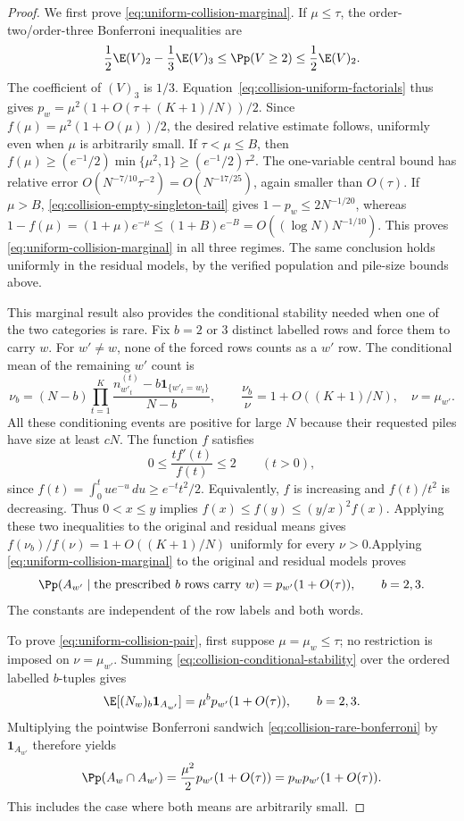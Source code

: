 \begin{proof}
We first prove \eqref{eq:uniform-collision-marginal}.
If $\mu\le\tau$, the order-two/order-three Bonferroni inequalities are
\begin{equation}
\label{eq:collision-rare-bonferroni}
 \frac12\E(V)_2-\frac13\E(V)_3
 \le\Pp(V\ge2)\le\frac12\E(V)_2.
\end{equation}
The coefficient of $(V)_3$ is $1/3$.
Equation~\eqref{eq:collision-uniform-factorials} thus gives
$p_w=\mu^2(1+O(\tau+(K+1)/N))/2$.
Since $f(\mu)=\mu^2(1+O(\mu))/2$, the desired relative estimate follows,
uniformly even when $\mu$ is arbitrarily small.
If $\tau<\mu\le B$, then $f(\mu)\ge(e^{-1}/2)\min\{\mu^2,1\}\ge(e^{-1}/2)\tau^2$.
The one-variable central bound has relative error
$O(N^{-7/10}\tau^{-2})=O(N^{-17/25})$, again smaller than $O(\tau)$.
If $\mu>B$, \eqref{eq:collision-empty-singleton-tail} gives
$1-p_w\le2N^{-1/20}$, whereas
$1-f(\mu)=(1+\mu)e^{-\mu}\le(1+B)e^{-B}=O((\log N)N^{-1/10})$.
This proves \eqref{eq:uniform-collision-marginal} in all three regimes.
The same conclusion holds uniformly in the residual models, by the verified
population and pile-size bounds above.

This marginal result also provides the conditional stability needed when
one of the two categories is rare. Fix $b=2$ or $3$ distinct labelled rows
and force them to carry $w$. For $w'\ne w$, none of the forced rows counts
as a $w'$ row. The conditional mean of the remaining $w'$ count is
\[
 \nu_b=(N-b)\prod_{t=1}^{K}
 \frac{n_{w'_t}^{(t)}-b\mathbf 1_{\{w'_t=w_t\}}}{N-b},
 \qquad \frac{\nu_b}{\nu}=1+O((K+1)/N),\quad\nu=\mu_{w'}.
\]
All these conditioning events are positive for large $N$ because their
requested piles have size at least $cN$. The function $f$ satisfies
\[
 0\le\frac{tf'(t)}{f(t)}\le2\qquad(t>0),
\]
since $f(t)=\int_0^t u e^{-u}\,du\ge e^{-t}t^2/2$.
Equivalently, $f$ is increasing and $f(t)/t^2$ is decreasing. Thus
$0<x\le y$ implies $f(x)\le f(y)\le(y/x)^2f(x)$. Applying these two
inequalities to the original and residual means gives
$f(\nu_b)/f(\nu)=1+O((K+1)/N)$ uniformly for every $\nu>0$.Applying \eqref{eq:uniform-collision-marginal} to the original and residual
models proves
\begin{equation}
\label{eq:collision-conditional-stability}
 \Pp(A_{w'}\mid\text{the prescribed $b$ rows carry $w$})
 =p_{w'}(1+O(\tau)),\qquad b=2,3.
\end{equation}
The constants are independent of the row labels and both words.

To prove \eqref{eq:uniform-collision-pair}, first suppose
$\mu=\mu_w\le\tau$; no restriction is imposed on $\nu=\mu_{w'}$.
Summing \eqref{eq:collision-conditional-stability} over the ordered labelled
$b$-tuples gives
\[
 \E[(N_w)_b\mathbf 1_{A_{w'}}]
 =\mu^b p_{w'}(1+O(\tau)),\qquad b=2,3.
\]
Multiplying the pointwise Bonferroni sandwich
\eqref{eq:collision-rare-bonferroni} by $\mathbf 1_{A_{w'}}$ therefore yields
\[
 \Pp(A_w\cap A_{w'})=\frac{\mu^2}2p_{w'}(1+O(\tau))
 =p_wp_{w'}(1+O(\tau)).
\]
This includes the case where both means are arbitrarily small.


\end{proof}
